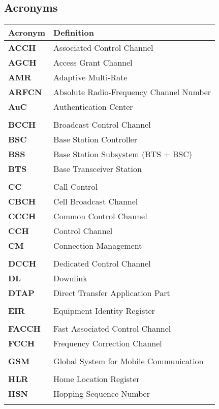 \documentclass[documentation]{subfiles}
\begin{document}
\subsection{Acronyms}
\begin{longtable}{>{\bf}ll}
    \toprule
    {\bf Acronym} & {\bf Definition}\\
    \midrule\endhead%
    ACCH    & Associated Control Channel\\
    AGCH    & Access Grant Channel\\
    AMR     & Adaptive Multi-Rate\\
    ARFCN   & Absolute Radio-Frequency Channel Number\\
    AuC     & Authentication Center\\
    \\
    BCCH    & Broadcast Control Channel\\
    BSC     & Base Station Controller\\
    BSS     & Base Station Subsystem (BTS + BSC)\\
    BTS     & Base Transceiver Station\\
    \\
    CC      & Call Control\\
    CBCH    & Cell Broadcast Channel\\
    CCCH    & Common Control Channel\\
    CCH     & Control Channel\\
    CM      & Connection Management\\
    \\
    DCCH    & Dedicated Control Channel\\
    DL      & Downlink\\
    DTAP    & Direct Transfer Application Part\\
    \\
    EIR     & Equipment Identity Register\\
    \\
    FACCH   & Fast Associated Control Channel\\
    FCCH    & Frequency Correction Channel\\
    \\
    GSM     & Global System for Mobile Communication\\
    \\
    HLR     & Home Location Register\\
    HSN     & Hopping Sequence Number\\
    \\

\end{longtable}
\end{document}

